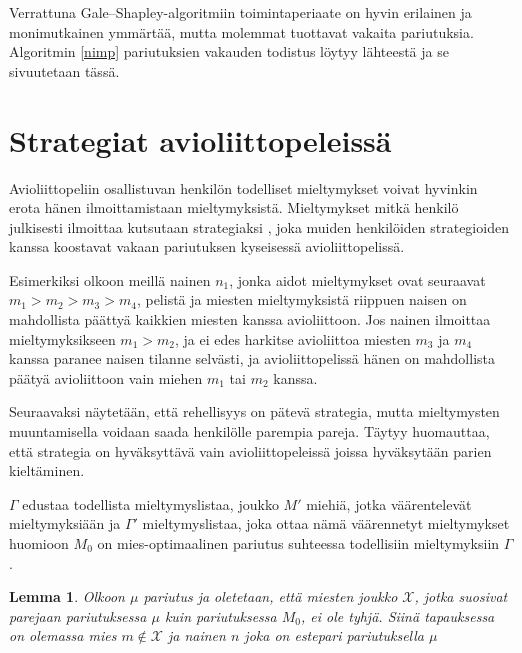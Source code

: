 \documentclass[finnish]{tktltiki2}
\newtheorem{lem}[lau]{Lemma}
\theoremstyle{definition}
\theoremstyle{remark}
\begin{document}
Verrattuna Gale--Shapley-algoritmiin toimintaperiaate on hyvin erilainen ja monimutkainen ymmärtää, mutta molemmat tuottavat vakaita pariutuksia. Algoritmin \ref{nimp} pariutuksien vakauden todistus löytyy lähteestä ja se sivuutetaan tässä.

\section{Strategiat avioliittopeleissä}
Avioliittopeliin osallistuvan henkilön todelliset mieltymykset voivat hyvinkin erota hänen ilmoittamistaan mieltymyksistä. Mieltymykset mitkä henkilö julkisesti ilmoittaa kutsutaan strategiaksi \cite[s. 592]{Balinski}, joka muiden henkilöiden strategioiden kanssa koostavat vakaan pariutuksen kyseisessä avioliittopelissä.

Esimerkiksi olkoon meillä nainen $n_1$, jonka aidot mieltymykset ovat seuraavat $m_1 > m_2 > m_3 > m_4$, pelistä ja miesten mieltymyksistä riippuen naisen on mahdollista päättyä kaikkien miesten kanssa avioliittoon. Jos nainen ilmoittaa mieltymyksikseen $m_1 > m_2$, ja ei edes harkitse avioliittoa miesten $m_3$ ja $m_4$ kanssa paranee naisen tilanne selvästi, ja avioliittopelissä hänen on mahdollista päätyä avioliittoon vain miehen $m_1$ tai $m_2$ kanssa.

Seuraavaksi näytetään, että rehellisyys on pätevä strategia, mutta mieltymysten muuntamisella voidaan saada henkilölle parempia pareja. Täytyy huomauttaa, että strategia on hyväksyttävä vain avioliittopeleissä joissa hyväksytään parien kieltäminen.

$\Gamma$ edustaa todellista mieltymyslistaa, joukko $M'$ miehiä, jotka väärentelevät mieltymyksiään ja $\Gamma'$ mieltymyslistaa, joka ottaa nämä väärennetyt mieltymykset huomioon $M_0$ on mies-optimaalinen pariutus suhteessa todellisiin mieltymyksiin $\Gamma$. 

\begin{lem}\cite[s. 55]{gusfield1989stable}\label{strategy-blocking}
	Olkoon $\mu$ pariutus ja oletetaan, että miesten joukko $\mathcal{X}$, jotka suosivat parejaan pariutuksessa $\mu$ kuin pariutuksessa $M_0$, ei ole tyhjä. Siinä tapauksessa on olemassa mies $m \notin \mathcal{X}$ ja nainen $n$ joka on estepari pariutuksella $\mu$
\end{lem}
\end{document}
